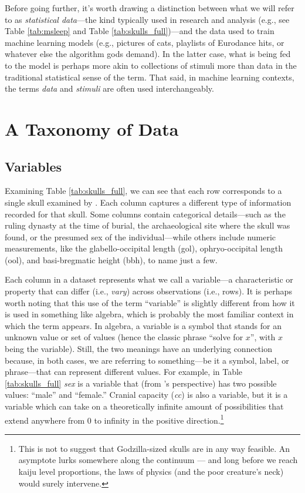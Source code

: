 Before going further, it’s worth drawing a distinction between what we will refer to as \textit{statistical data}—the kind typically used in research and analysis (e.g., see Table \ref{tab:msleep} and Table \ref{tab:skulls_full})—and the data used to train machine learning models (e.g., pictures of cats, playlists of Eurodance hits, or whatever else the algorithm gods demand). In the latter case, what is being fed to the model is perhaps more akin to collections of stimuli more than data in the traditional statistical sense of the term. That said, in machine learning contexts, the terms \textit{data} and \textit{stimuli} are often used interchangeably.

\section{A Taxonomy of Data}

\subsection{Variables}

Examining Table \ref{tab:skulls_full}, we can see that each row corresponds to a single skull examined by \textcite{Thomson1905}. Each column captures a different type of information recorded for that skull. Some columns contain categorical details—such as the ruling dynasty at the time of burial, the archaeological site where the skull was found, or the presumed sex of the individual—while others include numeric measurements, like the glabello-occipital length (gol), ophryo-occipital length (ool), and basi-bregmatic height (bbh), to name just a few.

Each column in a dataset represents what we call a \gls{variable}—a characteristic or property that can differ (i.e., \textit{vary}) across observations (i.e., rows). It is perhaps worth noting that this use of the term ``variable'' is slightly different from how it is used in something like algebra, which is probably the most familiar context in which the term appears. In algebra, a variable is a symbol that stands for an unknown value or set of values (hence the classic phrase ``solve for $x$'', with $x$ being the variable). Still, the two meanings have an underlying connection because, in both cases, we are referring to something—be it a symbol, label, or phrase—that can represent different values. For example, in Table \ref{tab:skulls_full} \textit{sex} is a variable that (from \citeauthor{Thomson1905}'s perspective) has two possible values: ``male'' and ``female.''  Cranial capacity (\textit{cc}) is also a variable, but it is a variable which can take on a theoretically infinite amount of possibilities that extend anywhere from 0 to infinity in the positive direction.\footnote{This is not to suggest that Godzilla-sized skulls are in any way feasible. An asymptote lurks somewhere along the continuum — and long before we reach kaiju level proportions, the laws of physics (and the poor creature’s neck) would surely intervene.}

